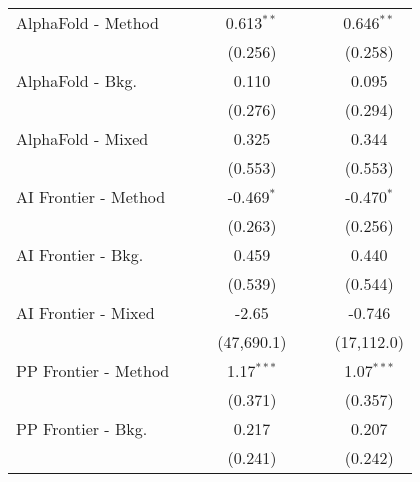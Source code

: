 \begin{tabular}{lcccccc}
   AlphaFold - Method           &                &               & 0.613$^{**}$  &                &               & 0.646$^{**}$\\   
                                &                &               & (0.256)       &                &               & (0.258)\\   
   AlphaFold - Bkg.             &                &               & 0.110         &                &               & 0.095\\   
                                &                &               & (0.276)       &                &               & (0.294)\\   
   AlphaFold - Mixed            &                &               & 0.325         &                &               & 0.344\\   
                                &                &               & (0.553)       &                &               & (0.553)\\   
   AI Frontier - Method         &                &               & -0.469$^{*}$  &                &               & -0.470$^{*}$\\   
                                &                &               & (0.263)       &                &               & (0.256)\\   
   AI Frontier - Bkg.           &                &               & 0.459         &                &               & 0.440\\   
                                &                &               & (0.539)       &                &               & (0.544)\\   
   AI Frontier - Mixed          &                &               & -2.65         &                &               & -0.746\\   
                                &                &               & (47,690.1)    &                &               & (17,112.0)\\   
   PP Frontier - Method         &                &               & 1.17$^{***}$  &                &               & 1.07$^{***}$\\   
                                &                &               & (0.371)       &                &               & (0.357)\\   
   PP Frontier - Bkg.           &                &               & 0.217         &                &               & 0.207\\   
                                &                &               & (0.241)       &                &               & (0.242)\\   

\end{tabular}
